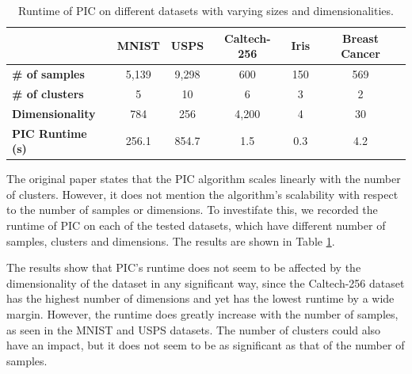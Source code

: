 \begin{table}[h]
    \centering
    \begin{tabular}{|l|c|c|c|c|c|}
    \hline
     & \textbf{MNIST} & \textbf{USPS} & \textbf{Caltech-256} & \textbf{Iris} & \textbf{Breast Cancer} \\
    \hline
    \textbf{\# of samples} & 5,139 & 9,298 & 600 & 150 & 569 \\ \hline
    \textbf{\# of clusters} & 5 & 10 & 6 & 3 & 2 \\ \hline
    \textbf{Dimensionality} & 784 & 256 & 4,200 & 4 & 30 \\ \hline
    \textbf{PIC Runtime (s)} & 256.1 & 854.7 & 1.5 & 0.3 & 4.2 \\ \hline
    \end{tabular}
    \caption{Runtime of PIC on different datasets with varying sizes and dimensionalities.}
    \label{table:time}
\end{table}

The original paper states that the PIC algorithm scales linearly with the number of clusters. However, it does not mention the algorithm's scalability with respect to the number of samples or dimensions. To investifate this, we recorded the runtime of PIC on each of the tested datasets, which have different number of samples, clusters and dimensions. The results are shown in Table \ref{table:time}.

The results show that PIC's runtime does not seem to be affected by the dimensionality of the dataset in any significant way, since the Caltech-256 dataset has the highest number of dimensions and yet has the lowest runtime by a wide margin. However, the runtime does greatly increase with the number of samples, as seen in the MNIST and USPS datasets. The number of clusters could also have an impact, but it does not seem to be as significant as that of the number of samples.
